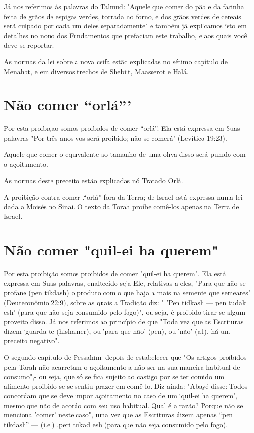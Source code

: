 Já nos referimos às palavras do Talmud: "Aquele que comer do pão e da
farinha feita de grãos de espigas verdes, torrada no forno, e dos grãos
ver­des de cereais será culpado por cada um deles separadamente" e
também já explicamos isto em detalhes no nono dos Fundamentos que
prefaciam este tra­balho, e aos quais você deve se reportar.

As normas da lei sobre a nova ceifa estão explicadas no sétimo capí­tulo
de Menahot, e em diversos trechos de Shebiit, Maasserot e Halá.

\section{Não comer ``orlá'''}

Por esta proibição somos proibidos de comer ``orlá''. Ela está ex­pressa
em Suas palavras "Por três anos vos será proibido; não se comerá"
(Le­vítico 19:23).

Aquele que comer o equivalente ao tamanho de uma oliva disso será punido
com o açoitamento.

As normas deste preceito estão explicadas nó Tratado Orlá.

A proibição contra comer .``orlá'' fora da Terra; de Israel está expres­sa
numa lei dada a Moisés no Sinai. O texto da Torah proíbe comê-los apenas
na Terra de Israel.


\section{Não comer "quil-ei ha querem"}

Por esta proibição somos proibidos de comer "quil-ei ha querem". Ela
está expressa em Suas palavras, enaltecido seja Ele, relativas a eles,
"Para que não se profane (pen tikdash) o produto com o que haja a mais
na semente que semeares" (Deuteronômio 22:9), sobre as quais a Tradição
diz: " 'Pen tid­kash --- pen tudak esh' (para que não seja consumido
pelo fogo)", ou seja, é proibido tirar-se algum proveito disso. Já nos
referimos ao princípio de que "To­da vez que as Escrituras dizem
`guarda-te (hishamer), ou 'para que não' (pen), ou 'não' (a1), há um
preceito negativo".

O segundo capítulo de Pessahim, depois de estabelecer que "Os ar­tigos
proibidos pela Torah não acarretam o açoitamento a não ser na sua
ma­neira habitual de consumo",- ou seja, que só se fica sujeito ao
castigo por se ter comido um alimento proibido se se sentiu prazer em
comê-lo. Diz ainda: "Abayé disse: Todos concordam que se deve impor
açoitamento no caso de um `quil-ei ha querem', mesmo que não de acordo
com seu uso habitual. Qual é a razão? Porque não se menciona 'comer'
neste caso", uma vez que as Escri­turas dizem apenas ``pen tikdash'' ---
(i.e.) .peri tukad esh (para que não seja consumido
pelo fogo).


